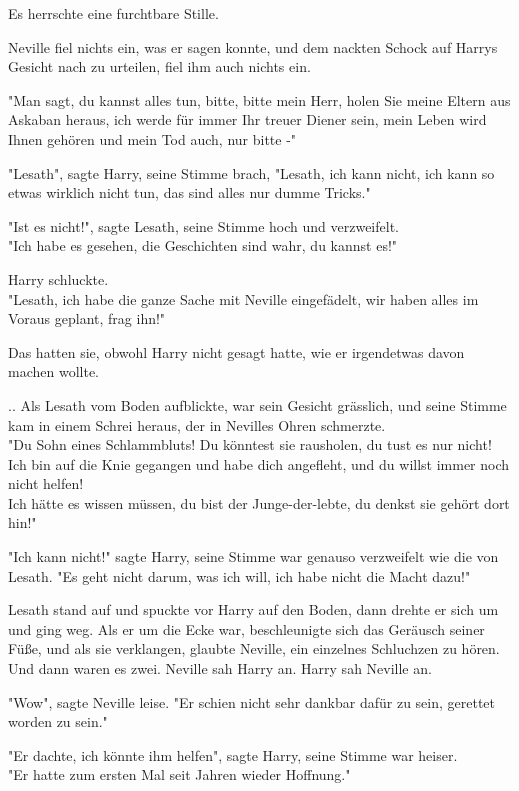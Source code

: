 {Es herrschte eine furchtbare Stille.

Neville fiel nichts ein, was er sagen konnte, und dem nackten Schock auf Harrys Gesicht nach zu urteilen, fiel ihm auch nichts ein.

"Man sagt, du kannst alles tun, bitte, bitte mein Herr, holen Sie meine Eltern aus Askaban heraus, ich werde für immer Ihr treuer Diener sein, mein Leben wird Ihnen gehören und mein Tod auch, nur bitte -"

"Lesath", sagte Harry, seine Stimme brach, "Lesath, ich kann nicht, ich kann so etwas wirklich nicht tun, das sind alles nur dumme Tricks."

"Ist es nicht!", sagte Lesath, seine Stimme hoch und verzweifelt.\\ "Ich habe es gesehen, die Geschichten sind wahr, du kannst es!"

Harry schluckte.\\ "Lesath, ich habe die ganze Sache mit Neville eingefädelt, wir haben alles im Voraus geplant, frag ihn!"

Das hatten sie, obwohl Harry nicht gesagt hatte, wie er irgendetwas davon machen wollte.

.. Als Lesath vom Boden aufblickte, war sein Gesicht grässlich, und seine Stimme kam in einem Schrei heraus, der in Nevilles Ohren schmerzte.\\ "Du Sohn eines Schlammbluts! Du könntest sie rausholen, du tust es nur nicht! Ich bin auf die Knie gegangen und habe dich angefleht, und du willst immer noch nicht helfen!\\ Ich hätte es wissen müssen, du bist der Junge-der-lebte, du denkst sie gehört dort hin!"

"Ich kann nicht!" sagte Harry, seine Stimme war genauso verzweifelt wie die von Lesath. "Es geht nicht darum, was ich will, ich habe nicht die Macht dazu!"

Lesath stand auf und spuckte vor Harry auf den Boden, dann drehte er sich um und ging weg. Als er um die Ecke war, beschleunigte sich das Geräusch seiner Füße, und als sie verklangen, glaubte Neville, ein einzelnes Schluchzen zu hören.\\ Und dann waren es zwei. Neville sah Harry an. Harry sah Neville an.

"Wow", sagte Neville leise. "Er schien nicht sehr dankbar dafür zu sein, gerettet worden zu sein."

"Er dachte, ich könnte ihm helfen", sagte Harry, seine Stimme war heiser.\\ "Er hatte zum ersten Mal seit Jahren wieder Hoffnung."

}
